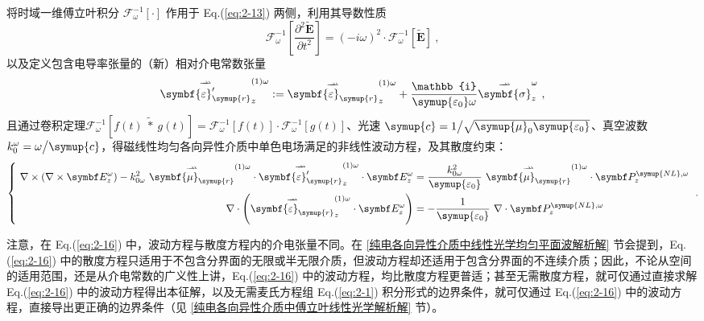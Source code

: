 将时域一维傅立叶积分 $\mathcal F^{-1}_\omega \left[ \cdot \right] $ 作用于 Eq.(\ref{eq:2-13}) 两侧，利用其导数性质
\begin{equation} \label{eq:2-14}
	\mathcal F^{-1}_\omega \left[ \displaystyle{\frac{\partial^2 \widetilde{\symbf E}}{\partial t^2}} \right] = \left( -i\omega \right)^2 \cdot \mathcal F^{-1}_\omega \left[ \widetilde{\symbf E} \right] ~,
\end{equation}
以及定义包含电导率张量的（新）相对介电常数张量
\begin{equation} \label{eq:2-15}
	\overset{\rightharpoonup\!\!\!\! \rightharpoonup}{\symbf{\varepsilon}'_{\symup{r}}}^{(1)\omega}_{z} := \overset{\rightharpoonup\!\!\!\! \rightharpoonup}{\symbf{\varepsilon}_{\symup{r}}}^{(1)\omega}_{z} + \displaystyle{ \frac{\mathbb{i}}{{\symup{\varepsilon_0} \omega}} } \overset{\rightharpoonup\!\!\!\! \rightharpoonup}{\symbf{\sigma}}^{\omega}_{z} ~,
\end{equation}
且通过卷积定理$ \mathcal F^{-1}_\omega \left[ f\left( t \right)\ \widetilde *\ g\left( t \right) \right] = \mathcal F^{-1}_\omega \left[ f\left( t \right) \right] \cdot \mathcal F^{-1}_\omega \left[ g\left( t \right) \right] $、光速 $\symup{c}=1 \big/ \sqrt{{\symup{\mu}}_0{\symup{\varepsilon_0}}}$、真空波数 $k^{\omega}_{0} = \omega \big/ \symup{c}$，得磁线性均匀各向异性介质中单色电场满足的非线性波动方程，及其散度约束：
\begin{equation} \label{eq:2-16}
	\left\{\ \begin{aligned} \nabla \times \left( \nabla \times \symbf E^{\omega}_z \right) - k^{2}_{0\omega}\ \overset{\rightharpoonup\!\!\!\! \rightharpoonup}{\symbf{\mu}_{\symup{r}}}^{(1)\omega} \cdot \overset{\rightharpoonup\!\!\!\! \rightharpoonup}{\symbf{\varepsilon}'_{\symup{r}}}^{(1)\omega}_{z} \cdot \symbf E^{\omega}_z &= \frac{k^{2}_{0\omega}}{{\symup{\varepsilon_0}}}\ \overset{\rightharpoonup\!\!\!\! \rightharpoonup}{\symbf{\mu}_{\symup{r}}}^{(1)\omega} \cdot \symbf P^{{\symup{NL}},\omega}_z \\ \nabla \cdot \left( \overset{\rightharpoonup\!\!\!\! \rightharpoonup}{\symbf{\varepsilon}_{\symup{r}}}^{(1)\omega}_{z} \cdot \symbf E^{\omega}_z \right) &= - \displaystyle{ \frac{1}{{\symup{\varepsilon_0}}} }\ \nabla \cdot \symbf P^{{\symup{NL}},\omega}_z \end{aligned}\right. ~.
\end{equation}

注意，在 Eq.(\ref{eq:2-16}) 中，波动方程与散度方程内的介电张量不同。在 \ref{纯电各向异性介质中线性光学均匀平面波解析解} 节会提到，Eq.(\ref{eq:2-16}) 中的散度方程只适用于不包含分界面的无限或半无限介质，但波动方程却还适用于包含分界面的不连续介质\cite{mcleodVectorFourierOptics2014,chenWavevectorspaceMethodWave1993,nelsonDerivingTransmissionReflection1995}；因此，不论从空间的适用范围，还是从介电常数的广义性上讲，Eq.(\ref{eq:2-16}) 中的波动方程，均比散度方程更普适；甚至无需散度方程，就可仅通过直接求解 Eq.(\ref{eq:2-16}) 中的波动方程\cite{mcleodVectorFourierOptics2014}得出本征解，以及无需麦氏方程组 Eq.(\ref{eq:2-1}) 积分形式的边界条件，就可仅通过 Eq.(\ref{eq:2-16}) 中的波动方程，直接导出更正确的边界条件\cite{chenWavevectorspaceMethodWave1993,nelsonDerivingTransmissionReflection1995}（见 \ref{纯电各向异性介质中傅立叶线性光学解析解} 节）。

